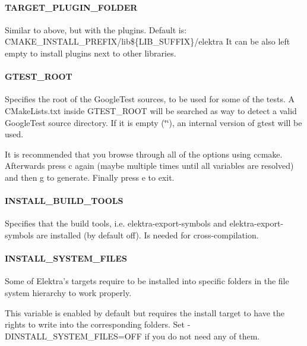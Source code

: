 \paragraph*{T\+A\+R\+G\+E\+T\+\_\+\+P\+L\+U\+G\+I\+N\+\_\+\+F\+O\+L\+D\+ER}

Similar to above, but with the plugins. Default is\+: {\ttfamily C\+M\+A\+K\+E\+\_\+\+I\+N\+S\+T\+A\+L\+L\+\_\+\+P\+R\+E\+F\+I\+X/lib\$\{L\+I\+B\+\_\+\+S\+U\+F\+F\+IX\}/elektra} It can be also left empty to install plugins next to other libraries.

\paragraph*{G\+T\+E\+S\+T\+\_\+\+R\+O\+OT}

Specifies the root of the Google\+Test sources, to be used for some of the tests. A {\ttfamily C\+Make\+Lists.\+txt} inside {\ttfamily G\+T\+E\+S\+T\+\_\+\+R\+O\+OT} will be searched as way to detect a valid Google\+Test source directory. If it is empty ({\ttfamily \char`\"{}\char`\"{}}), an internal version of gtest will be used.

It is recommended that you browse through all of the options using ccmake. Afterwards press \textquotesingle{}c\textquotesingle{} again (maybe multiple times until all variables are resolved) and then \textquotesingle{}g\textquotesingle{} to generate. Finally press \textquotesingle{}e\textquotesingle{} to exit.

\paragraph*{I\+N\+S\+T\+A\+L\+L\+\_\+\+B\+U\+I\+L\+D\+\_\+\+T\+O\+O\+LS}

Specifies that the build tools, i.\+e. {\ttfamily elektra-\/export-\/symbols} and {\ttfamily elektra-\/export-\/symbols} are installed (by default off). Is needed for cross-\/compilation.

\paragraph*{I\+N\+S\+T\+A\+L\+L\+\_\+\+S\+Y\+S\+T\+E\+M\+\_\+\+F\+I\+L\+ES}

Some of Elektra’s targets require to be installed into specific folders in the file system hierarchy to work properly.

This variable is enabled by default but requires the install target to have the rights to write into the corresponding folders. Set {\ttfamily -\/\+D\+I\+N\+S\+T\+A\+L\+L\+\_\+\+S\+Y\+S\+T\+E\+M\+\_\+\+F\+I\+L\+ES=O\+FF} if you do not need any of them.

